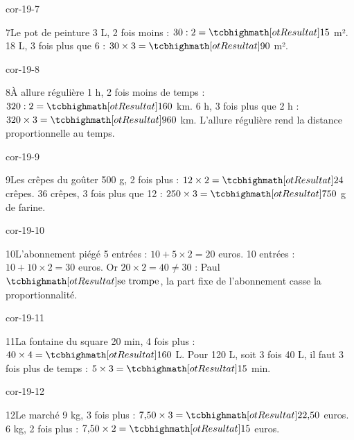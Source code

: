 \begin{blocLivre}{cor-19-7}\begin{corrige}{7}{Le pot de peinture}
3 L, 2 fois moins : $30:2=\res{15}$ m². 18 L, 3 fois plus que 6 : $30\times3=\res{90}$ m².
\end{corrige}\end{blocLivre}
\begin{blocLivre}{cor-19-8}\begin{corrige}{8}{À allure régulière}
1 h, 2 fois moins de temps : $320:2=\res{160}$ km. 6 h, 3 fois plus que 2 h : $320\times3=\res{960}$ km. L’allure régulière rend la distance proportionnelle au temps.
\end{corrige}\end{blocLivre}
\begin{blocLivre}{cor-19-9}\begin{corrige}{9}{Les crêpes du goûter}
500 g, 2 fois plus : $12\times2=\res{24}$ crêpes. 36 crêpes, 3 fois plus que 12 : $250\times3=\res{750}$ g de farine.
\end{corrige}\end{blocLivre}
\begin{blocLivre}{cor-19-10}\begin{corrige}{10}{L’abonnement piégé}
5 entrées : $10+5\times2=20$ euros. 10 entrées : $10+10\times2=30$ euros. Or $20\times2=40\ne30$ : Paul $\res{\text{se trompe}}$, la part fixe de l’abonnement casse la proportionnalité.
\end{corrige}\end{blocLivre}
\begin{blocLivre}{cor-19-11}\begin{corrige}{11}{La fontaine du square}
20 min, 4 fois plus : $40\times4=\res{160}$ L. Pour 120 L, soit 3 fois 40 L, il faut 3 fois plus de temps : $5\times3=\res{15}$ min.
\end{corrige}\end{blocLivre}
\begin{blocLivre}{cor-19-12}\begin{corrige}{12}{Le marché}
9 kg, 3 fois plus : $7{,}50\times3=\res{22{,}50}$ euros. 6 kg, 2 fois plus : $7{,}50\times2=\res{15}$ euros.
\end{corrige}\end{blocLivre}
